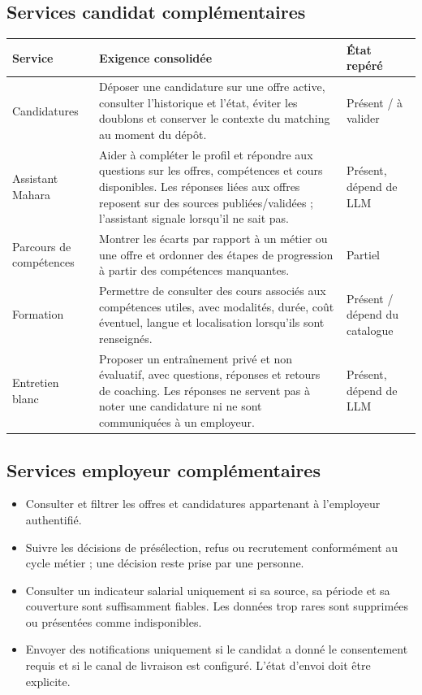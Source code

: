 \documentclass[11pt,a4paper]{article}
\newcommand{\status}[1]{\textsf{\small #1}}
\begin{document}
\subsection{Services candidat complémentaires}

\begin{longtable}{>{\raggedright\arraybackslash}p{} >{\raggedright\arraybackslash}p{} >{\raggedright\arraybackslash}p{}}
\toprule
\textbf{Service} & \textbf{Exigence consolidée} & \textbf{État repéré}\\
\midrule
\endhead
Candidatures & Déposer une candidature sur une offre active, consulter l'historique et l'état, éviter les doublons et conserver le contexte du matching au moment du dépôt. & \status{Présent / à valider}\\
Assistant Mahara & Aider à compléter le profil et répondre aux questions sur les offres, compétences et cours disponibles. Les réponses liées aux offres reposent sur des sources publiées/validées ; l'assistant signale lorsqu'il ne sait pas. & \status{Présent, dépend de LLM}\\
Parcours de compétences & Montrer les écarts par rapport à un métier ou une offre et ordonner des étapes de progression à partir des compétences manquantes. & \status{Partiel}\\
Formation & Permettre de consulter des cours associés aux compétences utiles, avec modalités, durée, coût éventuel, langue et localisation lorsqu'ils sont renseignés. & \status{Présent / dépend du catalogue}\\
Entretien blanc & Proposer un entraînement privé et non évaluatif, avec questions, réponses et retours de coaching. Les réponses ne servent pas à noter une candidature ni ne sont communiquées à un employeur. & \status{Présent, dépend de LLM}\\
\bottomrule
\end{longtable}

\subsection{Services employeur complémentaires}
\begin{itemize}
  \item Consulter et filtrer les offres et candidatures appartenant à l'employeur authentifié.
  \item Suivre les décisions de présélection, refus ou recrutement conformément au cycle métier ; une décision reste prise par une personne.
  \item Consulter un indicateur salarial uniquement si sa source, sa période et sa couverture sont suffisamment fiables. Les données trop rares sont supprimées ou présentées comme indisponibles.
  \item Envoyer des notifications uniquement si le candidat a donné le consentement requis et si le canal de livraison est configuré. L'état d'envoi doit être explicite.
\end{itemize}
\end{document}
